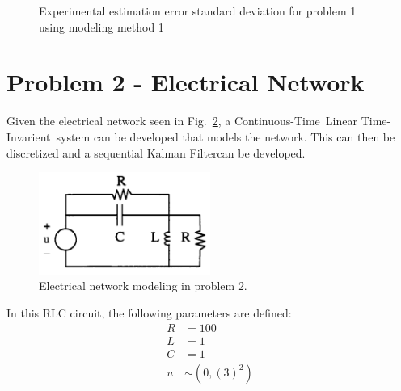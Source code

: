 \documentclass[]{article}
\newcommand{\KF}{Kalman Filter}
\newcommand{\CT}{Continuous-Time}
\newcommand{\LTI}{Linear Time-Invarient}
\renewcommand{\figurename}{Fig.}
\begin{document}
			\begin{figure}[h]
				\centering
				\caption{Experimental estimation error standard deviation for problem 1 using modeling method 1}
				\label{fig:pblm1stdmethod2}
			\end{figure}

\newpage
\section{Problem 2 - Electrical Network}
	Given the electrical network seen in \figurename \ \ref{fig:pblme2_circuit}, a \CT \ \LTI \ system can be developed that models the network. This can then be discretized and a sequential \KF can be developed.
	
	\begin{figure}[h]
		\centering
		\includegraphics[width=0.5\textwidth]{fig/pblm2_fig}
		\caption{Electrical network modeling in problem 2.}
		\label{fig:pblme2_circuit}
	\end{figure}
	
	In this RLC circuit, the following parameters are defined:
	\begin{equation}
		\begin{aligned}
			R &= 100\\
			L &= 1\\
			C &= 1\\
			u &\sim (0,(3)^2)\\
		\end{aligned}
	\end{equation}
	
\end{document}
